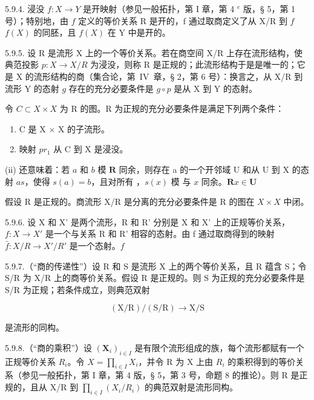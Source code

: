 5.9.4. 浸没 \(f: X \to Y\) 是开映射（参见一般拓扑，第 I 章，第 4 \(^{e}\) 版，§ 5，第 1 号）；特别地，由 \(f\) 定义的等价关系 R 是开的，f 通过取商定义了从 X/R 到 \(f\)\(f(X)\) 的同胚，且 \(f(X)\) 在 Y 中是开的。

5.9.5. 设 R 是流形 X 上的一个等价关系。若在商空间 X/R 上存在流形结构，使典范投影 \(p: X \to X/R\) 为浸没，则称 R 是正规的；此流形结构于是是唯一的；它是 X 的流形结构的商（集合论，第~IV~章，§ 2，第 6 号）：换言之，从 X/R 到流形 Y 的态射 \(g\) 存在的充分必要条件是 \(g \circ p\) 是从 X 到 Y 的态射。

令 \(C \subset X \times X\) 为 R 的图。R 为正规的充分必要条件是满足下列两个条件：

\begin{enumerate}
\def\labelenumi{(\roman{enumi})}
\item
  C 是 X × X 的子流形。
\item
  映射 \(pr_{1}\) 从 C 到 X 是浸没。
\end{enumerate}

(ii) 还意味着：若 \(a\) 和 \(b\) 模 \(\mathbf{R}\) 同余，则存在 a 的一个开邻域 U 和从 U 到 X 的态射 \(a\)\(s\)，使得 \(s(a) = b\)，且对所有 ，\(s(x)\) 模  与 \(x\) 同余。\(\mathbf{R}\)\(x \in \mathbf{U}\)

假设 R 是正规的。商流形 X/R 是分离的充分必要条件是 R 的图在 \(X \times X\) 中闭。

5.9.6. 设 X 和 X' 是两个流形，R 和 R' 分别是 X 和 X' 上的正规等价关系，\(f: X \to X'\) 是一个与关系 R 和 R' 相容的态射。由 f 通过取商得到的映射 \(\bar{f}: X/R \to X'/R'\) 是一个态射。\(f\)

5.9.7.（“商的传递性”）设 R 和 S 是流形 X 上的两个等价关系，且 R 蕴含 S；令 S/R 为 X/R 上的商等价关系。假设 R 是正规的。则 S 为正规的充分必要条件是 S/R 为正规；若条件成立，则典范双射

\[
(\mathrm{X} / \mathrm{R}) / (\mathrm{S} / \mathrm{R}) \rightarrow \mathrm{X} / \mathrm{S}
\]

是流形的同构。

5.9.8.（“商的乘积”）设 \((\mathbf{X}_{i})_{i\in I}\) 是有限个流形组成的族，每个流形都赋有一个正规等价关系 \(R_{i}\)。令 \(X = \prod_{i\in I} X_{i}\)，并令 R 为 X 上由 \(R_{i}\) 的乘积得到的等价关系（参见一般拓扑，第 I 章，第 4 版，§ 5，第 3 号，命题 8 的推论）。则 R 是正规的，且从 X/R 到 \(\prod_{i\in I}(X_{i}/R_{i})\) 的典范双射是流形同构。

